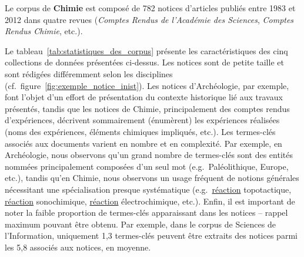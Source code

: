   Le corpus de \textbf{Chimie} est composé de 782 notices d'articles
  publiés entre 1983 et 2012 dans quatre revues (\textit{Comptes Rendus de
  l'Académie des Sciences}, \textit{Comptes Rendus Chimie}, etc.).

  Le tableau~\ref{tab:statistiques_des_corpus} présente les caractéristiques des
  cinq collections de données présentées ci-dessus.
  Les notices sont de petite taille et sont rédigées différemment selon
  les disciplines (cf.~figure~\ref{fig:exemple_notice_inist}). Les notices
  d'Archéologie, par exemple, font l'objet d'un effort de présentation du
  contexte historique lié aux travaux présentés, tandis que les notices de
  Chimie, principalement des comptes rendus d'expériences, décrivent
  sommairement (énumèrent) les expériences réalisées (noms des expériences,
  éléments chimiques impliqués, etc.). Les termes-clés associés aux documents
  varient en nombre et en complexité. Par exemple, en Archéologie, nous
  observons qu'un grand nombre de termes-clés sont des entités nommées
  principalement composées d'un seul mot (e.g.~\og{}Paléolithique\fg{},
  \og{}Europe\fg{}, etc.), tandis qu'en Chimie, nous observons un usage fréquent
  de notions générales nécessitant une spécialisation presque systématique
  (e.g.~\og{}\underline{réaction} topotactique\fg{}, \og{}\underline{réaction}
  sonochimique\fg{}, \og{}\underline{réaction} électrochimique\fg{}, etc.).
  Enfin, il est important de noter la faible proportion de termes-clés
  apparaissant dans les notices -- rappel maximum pouvant être obtenu. Par
  exemple, dans le corpus de Sciences de l'Information, uniquement 1,3
  termes-clés peuvent être extraits des notices parmi les 5,8 associés aux
  notices, en moyenne.
